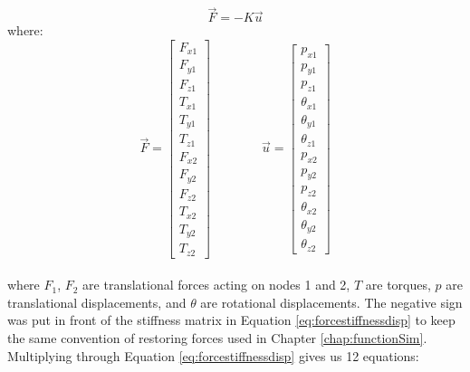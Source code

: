 { \begin{equation} \label{eq:forcestiffnessdisp} \vec{F} = -K\vec{u} \end{equation}
where:
\[ \vec{F} =  \left[ \begin{array}{ccc}
F_{x1}\\
F_{y1}\\
F_{z1}\\
T_{x1}\\
T_{y1}\\
T_{z1}\\
F_{x2}\\
F_{y2}\\
F_{z2}\\
T_{x2}\\
T_{y2}\\
T_{z2}
 \end{array} \right]  \qquad \qquad  
 \vec{u} =  \left[ \begin{array}{ccc}
p_{x1}\\
p_{y1}\\
p_{z1}\\
\theta_{x1}\\
\theta_{y1}\\
\theta_{z1}\\
p_{x2}\\
p_{y2}\\
p_{z2}\\
\theta_{x2}\\
\theta_{y2}\\
\theta_{z2}
 \end{array} \right]
 \]\\
 
where $F_1$, $F_2$ are translational forces acting on nodes 1 and 2, $T$ are torques, $p$ are translational displacements, and $\theta$ are rotational displacements.  The negative sign was put in front of the stiffness matrix in Equation \ref{eq:forcestiffnessdisp} to keep the same convention of restoring forces used in Chapter \ref{chap:functionSim}.\\

Multiplying through Equation \ref{eq:forcestiffnessdisp} gives us 12 equations:

}

